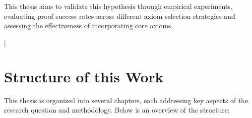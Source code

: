\documentclass[english,version-2020-11]{uzl-thesis}
\begin{document}
This thesis aims to validate this hypothesis through empirical experiments, evaluating proof success rates across different axiom selection strategies and assessing the effectiveness of incorporating core axioms.


\lstMakeShortInline[style=code,style=inline,language={[LaTeX]tex},moretexcs={chapter}]|


%


\section{Structure of this Work}

This thesis is organized into several chapters, each addressing key aspects of the research question and methodology. Below is an overview of the structure:
\end{document}
